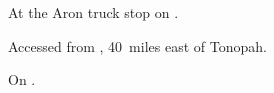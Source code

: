 
\begin{LocationList}

At the Aron truck stop on  .

Accessed from , 40~miles east of Tonopah.

\Location{\TruckService \Service}
On  .

\end{LocationList}
